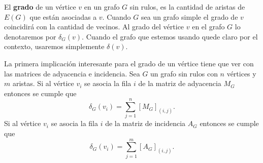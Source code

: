 \begin{definicion}
El {\bf grado} de un vértice $v$ en un grafo $G$ sin rulos, es la cantidad de aristas de $E(G)$ que están asociadas a $v$.
Cuando $G$ sea un grafo simple el grado de $v$ coincidirá con la cantidad de vecinos.
Al grado del vértice $v$ en el grafo $G$ lo denotaremos por $\delta_G(v)$.
Cuando el grafo que estemos usando quede claro por el contexto, usaremos simplemente $\delta(v)$.
\end{definicion}

La primera implicación interesante para el grado de un vértice tiene que ver con las matrices de adyacencia e incidencia.
Sea $G$ un grafo sin rulos con $n$ vértices y $m$ aristas.
Si al vértice $v_i$ se asocia la fila $i$ de la matriz de adyacencia $M_G$ entonces se cumple que 
\[
\delta_G(v_i)=\sum_{j=1}^{n}[M_G]_{(i,j)}.
\]
Si al vértice $v_i$ se asocia la fila $i$ de la matriz de incidencia $A_G$ entonces se cumple que
\[
\delta_G(v_i)=\sum_{j=1}^{m}[A_G]_{(i,j)}.
\]

